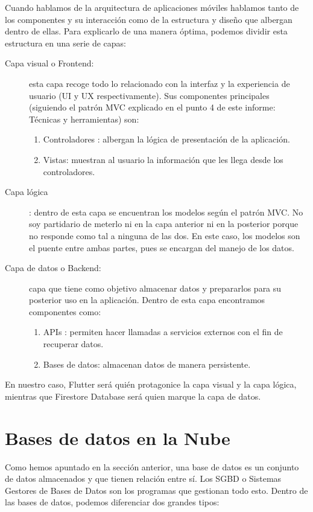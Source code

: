 	Cuando hablamos de la arquitectura de aplicaciones móviles hablamos tanto de los componentes y su interacción como de la estructura y diseño que albergan dentro de ellas. Para explicarlo de una manera óptima, podemos dividir esta estructura en una serie de capas:
	
	\begin{description}
		\item[Capa visual o Frontend:] esta capa recoge todo lo relacionado con la interfaz y la experiencia de usuario (UI y UX respectivamente). Sus componentes principales (siguiendo el patrón MVC explicado en el punto 4 de este informe: Técnicas y herramientas) son:
			\begin{enumerate}
				\item Controladores : albergan la lógica de presentación de la aplicación.
				\item Vistas: muestran al usuario la información que les llega desde los controladores.
			\end{enumerate}
		\item[Capa lógica]: dentro de esta capa se encuentran los modelos según el patrón MVC. No soy partidario de meterlo ni en la capa anterior ni en la posterior porque no responde como tal a ninguna de las dos. En este caso, los modelos son el puente entre ambas partes, pues se encargan del manejo de los datos.
		\item[Capa de datos o Backend:] capa que tiene como objetivo almacenar datos y prepararlos para su posterior uso en la aplicación. Dentro de esta capa encontramos componentes como:
			\begin{enumerate}
				\item APIs : permiten hacer llamadas a servicios externos con el fin de recuperar datos.
				\item Bases de datos: almacenan datos de manera persistente.
			\end{enumerate}
	\end{description}
	
	En nuestro caso, Flutter será quién protagonice la capa visual y la capa lógica, mientras que Firestore Database será quien marque la capa de datos.
	
\section{Bases de datos en la Nube}

	Como hemos apuntado en la sección anterior, una base de datos es un conjunto de datos almacenados y que tienen relación entre sí. Los SGBD o Sistemas Gestores de Bases de Datos son los programas que gestionan todo esto. Dentro de las bases de datos, podemos diferenciar dos grandes tipos:
	
